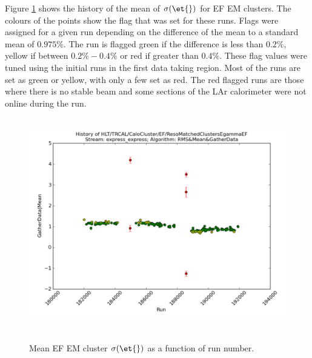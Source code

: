Figure \ref{SW_egamma_EF_Reso_Range} shows the history of the mean of $\sigma(\et{})$ for EF EM clusters.
The colours of the points show the flag that was set for these runs.
Flags were assigned for a given run depending on the difference of the mean to a standard mean of $0.975\%$. 
The run is flagged green if the difference is less than $0.2\%$, yellow if between $0.2\% - 0.4\%$ or red if greater than $0.4\%$.
These flag values were tuned using the initial runs in the first data taking region.
Most of the runs are set as green or yellow, with only a few set as red.
The red flagged runs are those where there is no stable beam and some sections of the LAr calorimeter were not online during the run.


\begin{figure}
\centering
\mbox{
   \includegraphics[width=1.0\textwidth]{figures/ServiceWork/EF_Reso_Range.pdf}
}
\caption[Mean EF EM cluster \et{} resolution as a function of run number]{
Mean EF EM cluster $\sigma(\et{})$ as a function of run number. 
\label{SW_egamma_EF_Reso_Range}}
\end{figure}

